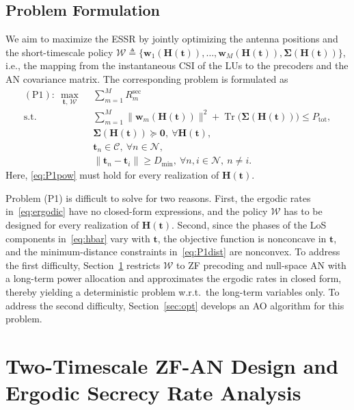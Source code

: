 \documentclass[journal]{IEEEtran}
\newcommand{\tr}{\operatorname{Tr}}
\newcommand{\bt}{\mathbf{t}}
\newcommand{\bH}{\mathbf{H}}
\newcommand{\bw}{\mathbf{w}}
\newcommand{\bSig}{\boldsymbol{\Sigma}}
\newcommand{\Ptot}{P_{\mathrm{tot}}}
\newcommand{\Dmin}{D_{\mathrm{min}}}
\begin{document}
\subsection{Problem Formulation}

We aim to maximize the ESSR by jointly optimizing the antenna positions and the short-timescale policy $\mathcal W\triangleq\{\bw_1(\bH(\bt)),\ldots,\bw_M(\bH(\bt)),\bSig(\bH(\bt))\}$, i.e., the mapping from the instantaneous CSI of the LUs to the precoders and the AN covariance matrix. The corresponding problem is formulated as
\begin{subequations}\label{eq:P1}
\begin{align}
(\mathrm{P1}):\ \max_{\bt,\,\mathcal W}\ \ & \sum_{m=1}^{M}R_m^{\mathrm{sec}}\label{eq:P1obj}\\
\mathrm{s.t.}\ \ & \sum_{m=1}^M\big\|\bw_m(\bH(\bt))\big\|^2+\tr\big(\bSig(\bH(\bt))\big)\le\Ptot,\nonumber\\
& \bSig(\bH(\bt))\succeq\mathbf 0,\ \forall\bH(\bt),\label{eq:P1pow}\\
& \bt_n\in\mathcal C,\ \forall n\in\mathcal N,\label{eq:P1region}\\
& \|\bt_n-\bt_i\|\ge\Dmin,\ \forall n,i\in\mathcal N,\ n\neq i.\label{eq:P1dist}
\end{align}
\end{subequations}
Here, \eqref{eq:P1pow} must hold for every realization of $\bH(\bt)$.

Problem (P1) is difficult to solve for two reasons. First, the ergodic rates in~\eqref{eq:ergodic} have no closed-form expressions, and the policy $\mathcal W$ has to be designed for every realization of $\bH(\bt)$. Second, since the phases of the LoS components in~\eqref{eq:hbar} vary with $\bt$, the objective function is nonconcave in $\bt$, and the minimum-distance constraints in~\eqref{eq:P1dist} are nonconvex. To address the first difficulty, Section~\ref{sec:analysis} restricts $\mathcal W$ to ZF precoding and null-space AN with a long-term power allocation and approximates the ergodic rates in closed form, thereby yielding a deterministic problem w.r.t.\ the long-term variables only. To address the second difficulty, Section~\ref{sec:opt} develops an AO algorithm for this problem.

\section{Two-Timescale ZF-AN Design and Ergodic Secrecy Rate Analysis}\label{sec:analysis}
\end{document}
